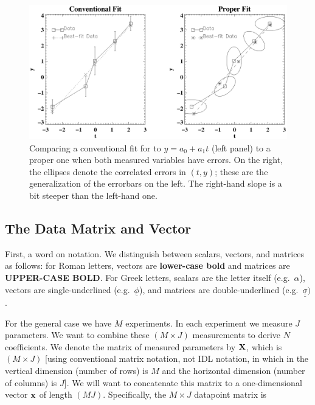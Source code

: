 \documentclass[psfig,preprint]{aastex}
\begin{document}
\begin{figure}[h!]
\begin{center}
\includegraphics[scale=0.8]{jeff_fig.ps}
\end{center}
\caption{Comparing a conventional fit for to $y=a_0 + a_1t$ (left panel)
to a proper one when both measured variables have errors. On the right,
the ellipses denote the correlated errors in $(t,y)$; these are the
generalization of the errorbars on the left. The right-hand slope is a
bit steeper than the left-hand one.
\label{jeff_fig}}
\end{figure} 

\subsection{The Data Matrix and Vector}

First, a word on notation.  We distinguish between scalars, vectors, and
matrices as follows: for Roman letters, vectors are {\bf lower-case
bold} and matrices are {\bf UPPER-CASE BOLD}.  For Greek letters,
scalars are the letter itself (e.g.\ $\alpha$), vectors are
single-underlined (e.g.\ $\underline{\phi}$), and matrices are
double-underlined (e.g.\
$\underline{\underline{\sigma}})$.

For the general case we have $M$ experiments.  In each experiment we
measure $J$ parameters.  We want to combine these $(M \times J)$
measurements to derive $N$ coefficients.  We denote the matrix of
measured parameters by ${\bf X}$, which is $(M \times J)$ [using
conventional matrix notation, not IDL notation, in which in the vertical
dimension (number of rows) is $M$ and the horizontal dimension (number
of columns) is $J$].  We will want to concatenate this matrix to a
one-dimensional vector ${\bf x}$ of length $(MJ)$.  Specifically, the $M
\times J$ datapoint matrix is 
\end{document}
